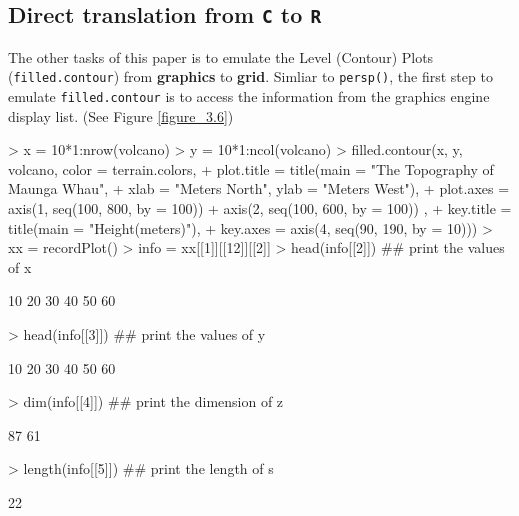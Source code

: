 \documentclass[paper=a4, fontsize=11pt]{report}
\begin{document}
\subsection{Direct translation from \texttt{C} to \texttt{R}}
The other tasks of this paper is to emulate the Level (Contour) Plots (\texttt{filled.contour}) from \textbf{graphics} to \textbf{grid}. Simliar to \texttt{persp()}, the first step to emulate \texttt{filled.contour} is to access the information from the graphics engine display list. (See Figure \ref{figure_3.6})
\begin{Schunk}
\begin{Sinput}
> x = 10*1:nrow(volcano)
> y = 10*1:ncol(volcano)
> filled.contour(x, y, volcano, color = terrain.colors,
+               plot.title = title(main = "The Topography of Maunga Whau",
+               xlab = "Meters North", ylab = "Meters West"),
+               plot.axes = { axis(1, seq(100, 800, by = 100))
+               axis(2, seq(100, 600, by = 100)) },
+               key.title = title(main = "Height\n(meters)"),
+               key.axes = axis(4, seq(90, 190, by = 10)))
> xx = recordPlot()
> info = xx[[1]][[12]][[2]]
> head(info[[2]])  ## print the values of x
\end{Sinput}
\begin{Soutput}
[1] 10 20 30 40 50 60
\end{Soutput}
\begin{Sinput}
> head(info[[3]])  ## print the values of y
\end{Sinput}
\begin{Soutput}
[1] 10 20 30 40 50 60
\end{Soutput}
\begin{Sinput}
> dim(info[[4]])  ## print the dimension of z
\end{Sinput}
\begin{Soutput}
[1] 87 61
\end{Soutput}
\begin{Sinput}
> length(info[[5]])  ## print the length of s
\end{Sinput}
\begin{Soutput}
[1] 22
\end{Soutput}
\end{Schunk}
\end{document}
